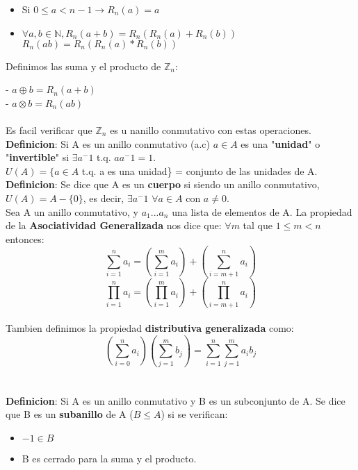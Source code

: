 \documentclass[11pt]{article}
\begin{document}
\begin{itemize}
\item Si $0 \leq a < n-1  \rightarrow R_n(a) = a$
\item $\forall a,b \in \mathbb{N}, R_n(a+b) = R_n(R_n(a) + R_n(b))$\\$R_n(ab) = R_n(R_n(a)*R_n(b))$

\end{itemize} 

Definimos las suma y el producto de $\mathbb{Z}_n$:

- $a\oplus b = R_n(a+b)$\\
\hspace*{0.6cm}- $a\otimes b = R_n(ab)$\\\\

Es facil verificar que $\mathbb{Z}_n$ es u nanillo conmutativo con estas operaciones.\\

\textbf{Definicion}:
Si A es un anillo conmutativo (a.c) $a \in A$ es una "\textbf{unidad}" o "\textbf{invertible}" si $\exists a^-1$ t.q. $ aa^-1 = 1$.\\ $U(A) = \{ a \in A$ t.q. a es una unidad\} = conjunto de las unidades de A.\\

\textbf{Definicion}: Se dice que A es un \textbf{cuerpo} si siendo un anillo conmutativo, $U(A) = A - \{0\}$, es decir, $\exists a^-1$ $\forall a \in A$ con $a \neq 0$.\\

Sea A un anillo conmutativo, y $a_1 ... a_n$ una lista de elementos de A.
La propiedad de la \textbf{Asociatividad Generalizada} nos dice que:
$\forall m$ tal que $1 \leq m < n$ entonces: \[\sum_{i=1}^{n}a_i = (\sum_{i=1}^{m}a_i) + (\sum_{i=m+1}^{n}a_i)\]\[\prod_{i=1}^{n}a_i = (\prod_{i=1}^{m}a_i) + (\prod_{i=m+1}^{n}a_i)\]\\

Tambien definimos la propiedad \textbf{distributiva generalizada} como:\\

\[(\sum_{i=0}^{n} a_i)(\sum_{j=1}^{m}b_j) = \sum_{i=1}^{n}\sum_{j=1}^{m}a_i b_j\]\\\\

\textbf{Definicion}:
Si A es un anillo conmutativo y B es un subconjunto de A. Se dice que B es un \textbf{subanillo} de A ($B \leq A$) si se verifican:
\begin{itemize}
\item $-1 \in B$
\item B es cerrado para la suma y el producto.
\end{itemize}
\end{document}
